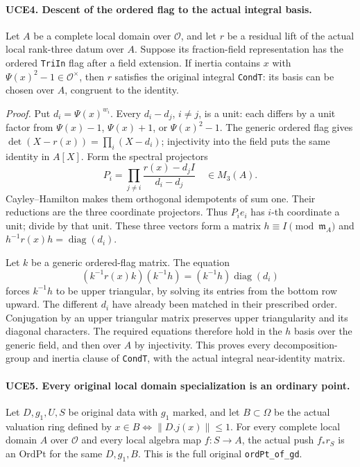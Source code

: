 \paragraph{UCE4. Descent of the ordered flag to the actual integral basis.}
\label{claim:UCE4}
Let \(A\) be a complete local domain over \(\mathcal O\), and let
\(r\) be a residual lift of the actual local rank-three datum over
\(A\).  Suppose its fraction-field representation has the ordered
\texttt{TriIn} flag after a field extension.  If inertia contains
\(x\) with \(\Psi(x)^2-1\in\mathcal O^\times\), then \(r\)
satisfies the original integral \texttt{CondT}: its basis can be
chosen over \(A\), congruent to the identity.

\emph{Proof.}
Put \(d_i=\Psi(x)^{w_i}\).  Every \(d_i-d_j\), \(i\ne j\),
is a unit: each differs by a unit factor from \(\Psi(x)-1\),
\(\Psi(x)+1\), or \(\Psi(x)^2-1\).
The generic ordered flag gives
\(\det(X-r(x))=\prod_i(X-d_i)\); injectivity into the field
puts the same identity in \(A[X]\).  Form the spectral projectors
\[
 P_i=\prod_{j\ne i}\frac{r(x)-d_jI}{d_i-d_j}\quad\in M_3(A).
 \tag{UCE.4}
\]
Cayley--Hamilton makes them orthogonal idempotents of sum one.
Their reductions are the three coordinate projectors.  Thus
\(P_i e_i\) has \(i\)-th coordinate a unit; divide by that unit.
These three vectors form a matrix \(h\equiv I\pmod{\mathfrak m_A}\)
and \(h^{-1}r(x)h=\operatorname{diag}(d_i)\).

Let \(k\) be a generic ordered-flag matrix.  The equation
\[
       (k^{-1}r(x)k)(k^{-1}h)=(k^{-1}h)\operatorname{diag}(d_i)
\]
forces \(k^{-1}h\) to be upper triangular, by solving its entries
from the bottom row upward.  The different \(d_i\) have already
been matched in their prescribed order.  Conjugation by an upper
triangular matrix preserves upper triangularity and its diagonal
characters.  The required equations therefore hold in the \(h\)
basis over the generic field, and then over \(A\) by injectivity.
This proves every decomposition-group and inertia clause of
\texttt{CondT}, with the actual integral near-identity matrix.

\paragraph{UCE5. Every original local domain specialization is an ordinary point.}
\label{claim:UCE5}
Let \(D,g_1,U,S\) be original data with \(g_1\) marked, and let
\(B\subset\Omega\) be the actual valuation ring defined by
\(x\in B\Longleftrightarrow\|D.j(x)\|\le1\).
For every complete local domain \(A\) over \(\mathcal O\) and
every local algebra map \(f:S\to A\), the actual push
\(f_*r_S\) is an \(\mathrm{OrdPt}\) for the same
\(D,g_1,B\).  This is the full original \texttt{ordPt\_of\_gd}.

